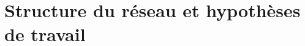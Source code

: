 \chapter{Structure du réseau et hypothèses de travail}\label{chap:st}

\renewcommand\chapterpath{Main/Structure}
\renewcommand\chapterfig{Main/Structure/Figures}


